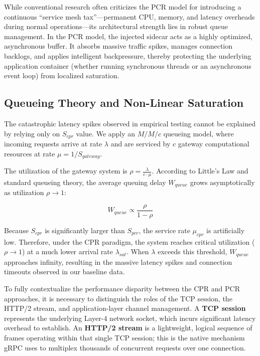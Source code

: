 \documentclass{ieeeaccess}
\begin{document}
While conventional research often criticizes the PCR model for introducing a continuous ``service mesh tax''—permanent CPU, memory, and latency overheads during normal operations—its architectural strength lies in robust queue management. In the PCR model, the injected sidecar acts as a highly optimized, asynchronous buffer. It absorbs massive traffic spikes, manages connection backlogs, and applies intelligent backpressure, thereby protecting the underlying application container (whether running synchronous threads or an asynchronous event loop) from localized saturation.

\subsection{Queueing Theory and Non-Linear Saturation}
\label{sec2.3}

The catastrophic latency spikes observed in empirical testing cannot be explained by relying only on $S_{cpr}$ value. We apply an $M/M/c$ queueing model, where incoming requests arrive at rate $\lambda$ and are serviced by $c$ gateway computational resources at rate $\mu = 1/S_{gateway}$.

The utilization of the gateway system is $\rho = \frac{\lambda}{c \cdot \mu}$. According to Little's Law \cite{little2011or} and standard queueing theory, the average queuing delay $W_{queue}$ grows asymptotically as utilization $\rho \to 1$:

\begin{equation}
    W_{queue} \propto \frac{\rho}{1 - \rho}
\end{equation}

Because $S_{cpr}$ is significantly larger than $S_{pcr}$, the service rate $\mu_{cpr}$ is artificially low. Therefore, under the CPR paradigm, the system reaches critical utilization ($\rho \to 1$) at a much lower arrival rate $\lambda_{sat}$. When $\lambda$ exceeds this threshold, $W_{queue}$ approaches infinity, resulting in the massive latency spikes and connection timeouts observed in our baseline data.

To fully contextualize the performance disparity between the CPR and PCR approaches, it is necessary to distinguish the roles of the TCP session, the HTTP/2 stream, and application-layer channel management. A \textbf{TCP session} represents the underlying Layer-4 network socket, which incurs significant latency overhead to establish. An \textbf{HTTP/2 stream} is a lightweight, logical sequence of frames operating within that single TCP session; this is the native mechanism gRPC uses to multiplex thousands of concurrent requests over one connection.
\end{document}
